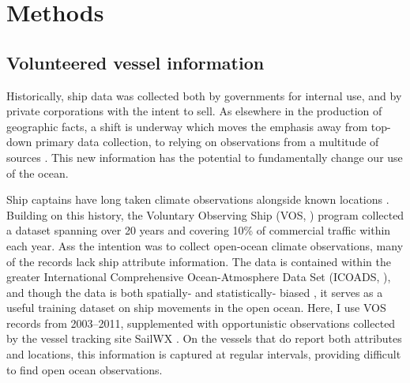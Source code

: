 \section{\textbf{Methods}}



\subsection{Volunteered vessel information}


Historically, ship data was collected both by governments for internal use, and by private corporations with the intent to sell. As elsewhere in the production of geographic facts, a shift is underway which moves the emphasis away from top-down primary data collection, to relying on observations from a multitude of sources \citep{goodchild2007citizens,elwood2011researching}. This new information has the potential to fundamentally change our use of the ocean.

Ship captains have long taken climate observations alongside known locations \citep{brohan2009marine}.  Building on this history, the Voluntary Observing Ship (VOS, \citealp{VOSOverview}) program collected a dataset spanning over 20 years and covering 10\% of commercial traffic within each year. Ass the intention was to collect open-ocean climate observations, many of the records lack ship attribute information. %
The data is contained within the greater International Comprehensive Ocean-Atmosphere Data Set (ICOADS, \citealp{woodruff2010icoads}), and though the data is both spatially- and statistically- biased \citep{Wang2007}, it serves as a useful training dataset on ship movements in the open ocean. Here, I use VOS records from 2003--2011, supplemented with opportunistic observations collected by the vessel tracking site SailWX \citep{SAILWX}. On the vessels that do report both attributes and locations, this information is captured at regular intervals, providing difficult to find open ocean observations.

